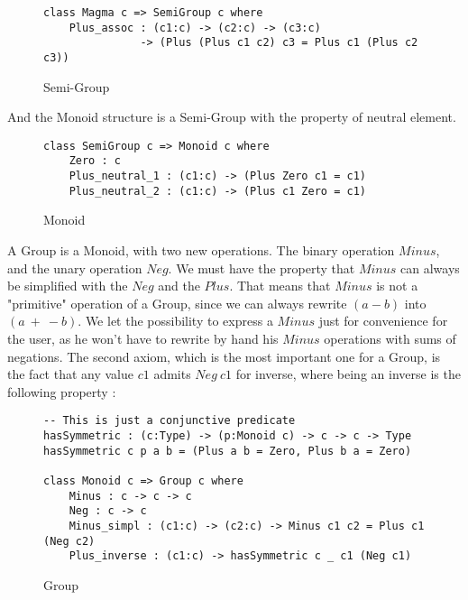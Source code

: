 \begin{figure}[H]
\figrule
\begin{center}
\begin{verbatim}
class Magma c => SemiGroup c where
    Plus_assoc : (c1:c) -> (c2:c) -> (c3:c) 
               -> (Plus (Plus c1 c2) c3 = Plus c1 (Plus c2 c3))
\end{verbatim}
\end{center}
\caption{Semi-Group}
\figrule
\end{figure}

And the Monoid structure is a Semi-Group with the property of neutral element.

\begin{figure}[H]
\figrule
\begin{center}
\begin{verbatim}
class SemiGroup c => Monoid c where
    Zero : c    
    Plus_neutral_1 : (c1:c) -> (Plus Zero c1 = c1)    
    Plus_neutral_2 : (c1:c) -> (Plus c1 Zero = c1)
\end{verbatim}
\end{center}
\caption{Monoid}
\figrule
\end{figure}

A Group is a Monoid, with two new operations. The binary operation $Minus$, and the unary operation $Neg$. We must have the property that $Minus$ can always be simplified with the $Neg$ and the $Plus$. That means that $Minus$ is not a "primitive" operation of a Group, since we can always rewrite $(a-b)$ into $(a\ +\ -b)$. We let the possibility to express a $Minus$ just for convenience for the user, as he won't have to rewrite by hand his $Minus$ operations with sums of negations.
The second axiom, which is the most important one for a Group, is the fact that any value $c1$ admits $Neg\ c1$ for inverse, where being an inverse is the following property :

\begin{figure}[H]
\figrule
\begin{center}
\begin{verbatim}
-- This is just a conjunctive predicate
hasSymmetric : (c:Type) -> (p:Monoid c) -> c -> c -> Type
hasSymmetric c p a b = (Plus a b = Zero, Plus b a = Zero)    
  
class Monoid c => Group c where
    Minus : c -> c -> c
    Neg : c -> c
    Minus_simpl : (c1:c) -> (c2:c) -> Minus c1 c2 = Plus c1 (Neg c2) 
    Plus_inverse : (c1:c) -> hasSymmetric c _ c1 (Neg c1)
\end{verbatim}
\end{center}
\caption{Group}
\figrule
\end{figure}


